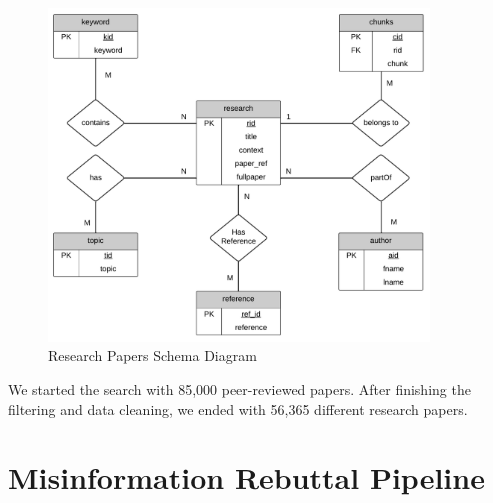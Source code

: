 \begin{figure}[H]
	\begin{center}
		\includegraphics[width=0.9\textwidth]{images/Table_diagram.png} %
	\end{center}
	\caption{Research Papers Schema Diagram} %
	\label{fig:table}
\end{figure}


We started the search with 85,000 peer-reviewed papers. After finishing the filtering and data cleaning, we ended with 56,365 different research papers. 




    



\section{Misinformation Rebuttal Pipeline}

